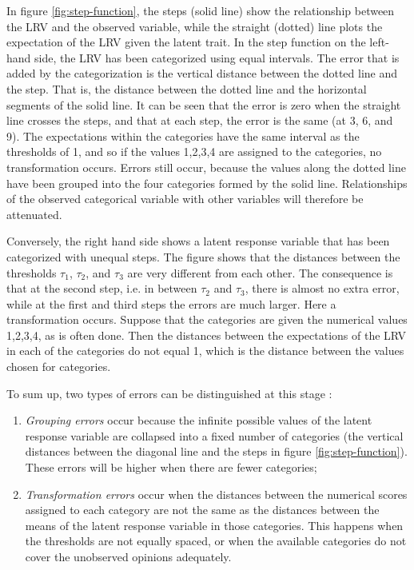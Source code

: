 \documentclass[a4paper,12pt]{article}
\begin{document}
In figure \ref{fig:step-function}, the steps (solid line) show the relationship between the LRV and the observed variable, while the straight (dotted) line plots the expectation of the LRV given the latent trait. In the step function on the left-hand side, the LRV has been categorized using equal intervals. The error that is added by the categorization is the vertical distance between the dotted line and the step. That is, the distance between the dotted line and the horizontal segments of the solid line. It can be seen that the error is zero when the straight line crosses the steps, and that at each step, the error is the same (at 3, 6, and 9). The expectations within the categories have the same interval as the thresholds of 1, and so if the values 1,2,3,4 are assigned to the categories, no transformation occurs. Errors still occur, because the values along the dotted line have been grouped into the four categories formed by the solid line. Relationships of the observed categorical variable with other variables will therefore be attenuated.



Conversely, the right hand side shows a latent response variable that has been categorized with unequal steps. The figure shows that the distances between the thresholds $\tau_1$, $\tau_2$, and $\tau_3$ are very different from each other. The consequence is that at the second step, i.e. in between $\tau_2$ and $\tau_3$, there is almost no extra error, while at the first and third steps the errors are much larger. Here a transformation occurs. Suppose that the categories are given the numerical values 1,2,3,4, as is often done. Then the distances between the expectations of the LRV in each of the categories do not equal 1, which is the distance between the values chosen for categories.

To sum up, two types of errors can be distinguished at this stage \citep{johnson_ordinal_1983}:
\begin{enumerate}
\item \emph{Grouping errors} occur because the infinite possible values of the latent response variable are collapsed into a fixed number of categories (the vertical distances between the diagonal line and the steps in figure \ref{fig:step-function}). These errors will be higher when there are fewer categories;
\item \emph{Transformation errors} occur when the distances between the numerical scores assigned to each category are not the same as the distances between the means of the latent response variable in those categories. This happens when the thresholds are not equally spaced, or when the available categories do not cover the unobserved opinions adequately. 
\end{enumerate}
\end{document}
